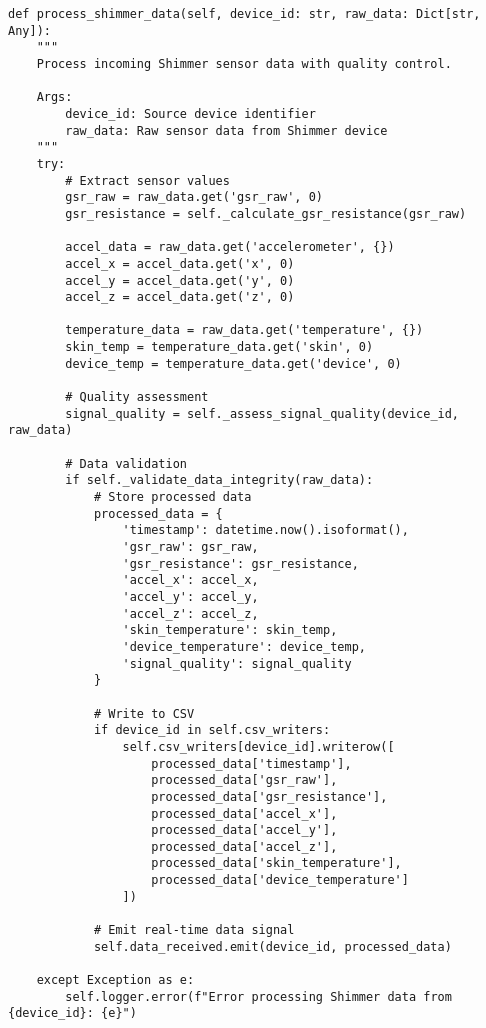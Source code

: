 \documentclass[12pt,a4paper]{article}
\begin{document}
\begin{verbatim}
def process_shimmer_data(self, device_id: str, raw_data: Dict[str, Any]):
    """
    Process incoming Shimmer sensor data with quality control.
    
    Args:
        device_id: Source device identifier
        raw_data: Raw sensor data from Shimmer device
    """
    try:
        # Extract sensor values
        gsr_raw = raw_data.get('gsr_raw', 0)
        gsr_resistance = self._calculate_gsr_resistance(gsr_raw)
        
        accel_data = raw_data.get('accelerometer', {})
        accel_x = accel_data.get('x', 0)
        accel_y = accel_data.get('y', 0)
        accel_z = accel_data.get('z', 0)
        
        temperature_data = raw_data.get('temperature', {})
        skin_temp = temperature_data.get('skin', 0)
        device_temp = temperature_data.get('device', 0)
        
        # Quality assessment
        signal_quality = self._assess_signal_quality(device_id, raw_data)
        
        # Data validation
        if self._validate_data_integrity(raw_data):
            # Store processed data
            processed_data = {
                'timestamp': datetime.now().isoformat(),
                'gsr_raw': gsr_raw,
                'gsr_resistance': gsr_resistance,
                'accel_x': accel_x,
                'accel_y': accel_y,
                'accel_z': accel_z,
                'skin_temperature': skin_temp,
                'device_temperature': device_temp,
                'signal_quality': signal_quality
            }
            
            # Write to CSV
            if device_id in self.csv_writers:
                self.csv_writers[device_id].writerow([
                    processed_data['timestamp'],
                    processed_data['gsr_raw'],
                    processed_data['gsr_resistance'],
                    processed_data['accel_x'],
                    processed_data['accel_y'],
                    processed_data['accel_z'],
                    processed_data['skin_temperature'],
                    processed_data['device_temperature']
                ])
            
            # Emit real-time data signal
            self.data_received.emit(device_id, processed_data)
        
    except Exception as e:
        self.logger.error(f"Error processing Shimmer data from {device_id}: {e}")
\end{verbatim}
\end{document}
